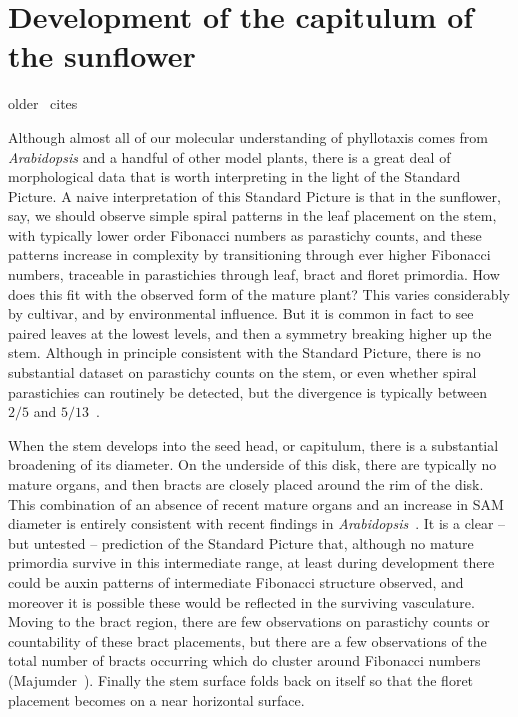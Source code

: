 \section{Development of the capitulum of the sunflower}
older~\cite{schneiterDescriptionSunflowerGrowth1981} cites~\cite{leiseringVerschiebungenHelianthuskopfenIm1902,leiseringZurFrageNach1902}

Although almost all of our molecular understanding of phyllotaxis comes from \textit{Arabidopsis} and a handful of other model plants, there is a great deal of morphological data that is worth interpreting in the light of the Standard Picture. 
A naive interpretation of this Standard Picture is that in the sunflower, say, we should observe simple spiral patterns in the leaf placement on the stem, with typically lower order Fibonacci numbers as parastichy counts, and these patterns increase in complexity by transitioning through ever higher Fibonacci numbers, traceable in parastichies through leaf, bract and floret primordia. How does this fit with the observed form of the mature plant? This varies considerably by cultivar, and by environmental influence.
But it is common in fact to see paired leaves at the lowest levels, and then a symmetry breaking higher up the stem. Although in principle consistent with the Standard Picture, there is no substantial dataset on parastichy counts on the stem, or even whether spiral parastichies can routinely be detected, but the divergence is typically between $2/5$ and $5/13$~\autocite{churchRelationPhyllotaxisMechanical1904}.  

When the stem develops into the seed head, or capitulum, there is a substantial broadening of its diameter. On the underside of this disk,  there are typically no mature organs, and then bracts are closely placed around the rim of the disk. This combination of an absence of recent mature organs and an increase in SAM diameter is entirely consistent with recent findings in \textit{Arabidopsis}~\cite{shiFeedbackLateralOrgans2018}. It is a clear -- but untested -- prediction of the Standard Picture that, although no mature primordia survive in this intermediate range, at least during development there could be  auxin patterns of intermediate Fibonacci structure observed,  and moreover it is possible these would be reflected in the surviving vasculature. Moving to the bract region,  there are few observations on parastichy counts or countability of these bract placements, but there are a few observations of the total number of bracts occurring which do cluster around Fibonacci numbers (Majumder~\cite{majumderVariationNumberRay1976}). Finally the stem surface folds back on itself so that the floret placement becomes on a near horizontal surface.
	
